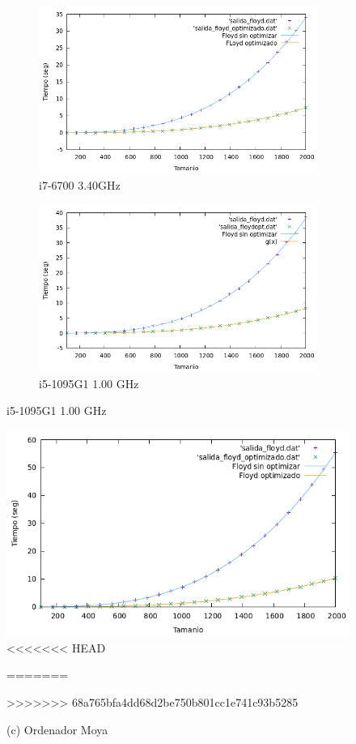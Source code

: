 \documentclass[10pt,a4paper]{article}
\begin{document}
\begin{figure}[h!]
\begin{subfigure}{.4\textwidth}
	\includegraphics[scale=0.3]{../../Images/floyd_opt_Javi5454.png}
	\caption{i7-6700 3.40GHz}
	\label{Floyd Optimizado Javi5454}
\end{subfigure}
\hfill
\begin{subfigure}{.4\textwidth}
	\includegraphics[scale=0.3]{../../Images/floyd_opt_Jota.png}
	\caption{i5-1095G1 1.00 GHz}
	\label{Floyd Optimizado Jota}
\end{subfigure}
\end{figure}

\begin{figure}[h!]
\centering
\includegraphics[scale=0.28]{../../Images/floyd_opt_ManuelMoya.png}
<<<<<<< HEAD
\caption*{(c) i5-7200 2.5GHz}
=======
\caption*{(c) Ordenador Moya}
>>>>>>> 68a765bfa4dd68d2be750b801cc1e741c93b5285
\end{figure}
\end{document}
